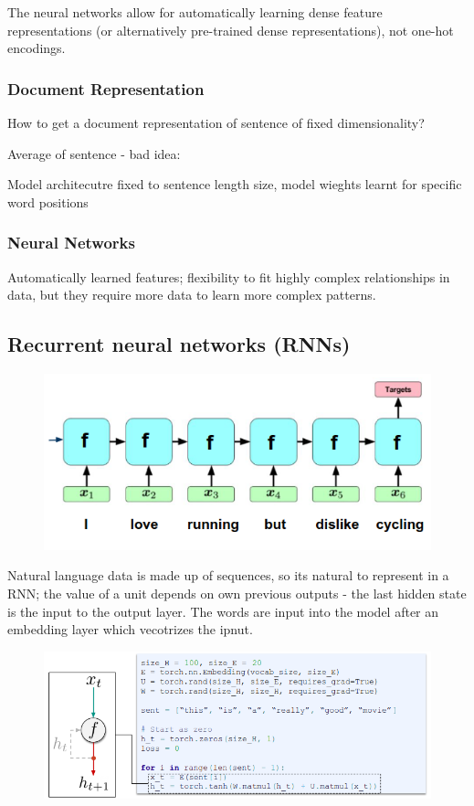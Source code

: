\documentclass[11pt]{article}
\begin{document}
The neural networks allow for automatically learning dense feature representations (or alternatively pre-trained dense representations), not one-hot encodings.

\subsubsection{Document Representation}

How to get a document representation of sentence of
fixed dimensionality?

Average of sentence - bad idea:
    
Model architecutre fixed to sentence length size, model wieghts learnt for specific word positions

\subsubsection{Neural Networks}

Automatically learned features; flexibility to fit highly complex relationships in data, but they require more data to learn more complex patterns.

\subsection{Recurrent neural networks (RNNs)}

\begin{figure}[H]
    \centering
    \includegraphics[width=.6\linewidth]{figures/RNN.png}    
\end{figure}

Natural language data is made up of sequences, so its natural to represent in a RNN; the value of a unit depends on own previous outputs - the last hidden state is the input to the output layer. The words are input into the model after an embedding layer which vecotrizes the ipnut.

\begin{figure}[H]
    \centering
    \includegraphics[width=.6\linewidth]{figures/VanillaRNN.png}    
\end{figure}
\end{document}
